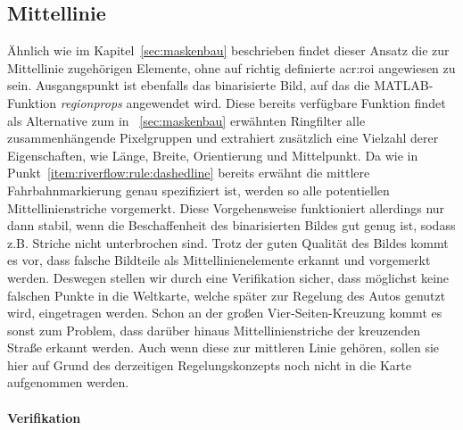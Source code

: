 \subsection{Mittellinie \dcfirstauthorshort}
\label{ssec:fahrspurerkennung:riverflow:mittellinie}
Ähnlich wie im Kapitel~\ref{sec:maskenbau} beschrieben findet dieser Ansatz die zur Mittellinie zugehörigen Elemente, ohne auf richtig definierte \gls{acr:roi} angewiesen zu sein. Ausgangspunkt ist ebenfalls das binarisierte Bild, auf das die MATLAB-Funktion \emph{regionprops} angewendet wird. Diese bereits verfügbare Funktion findet als Alternative zum in ~\ref{sec:maskenbau} erwähnten \glqq Ringfilter\grqq{} alle zusammenhängende Pixelgruppen und extrahiert zusätzlich eine Vielzahl derer Eigenschaften, wie Länge, Breite, Orientierung und Mittelpunkt. Da wie in Punkt~\ref{item:riverflow:rule:dashedline} bereits erwähnt die mittlere Fahrbahnmarkierung genau spezifiziert ist, werden so alle potentiellen Mittellinienstriche vorgemerkt. Diese Vorgehensweise funktioniert allerdings nur dann stabil, wenn die Beschaffenheit des binarisierten Bildes gut genug ist, sodass z.B. Striche nicht unterbrochen sind. Trotz der guten Qualität des Bildes kommt es vor, dass falsche Bildteile als Mittellinienelemente erkannt und vorgemerkt werden. Deswegen stellen wir durch eine Verifikation sicher, dass möglichst keine falschen Punkte in die Weltkarte, welche später zur Regelung des Autos genutzt wird, eingetragen werden. Schon an der großen Vier-Seiten-Kreuzung kommt es sonst zum Problem, dass darüber hinaus Mittellinienstriche der kreuzenden Straße erkannt werden. Auch wenn diese zur mittleren Linie gehören, sollen sie hier auf Grund des derzeitigen Regelungskonzepts noch nicht in die Karte aufgenommen werden. 

\paragraph{Verifikation}

